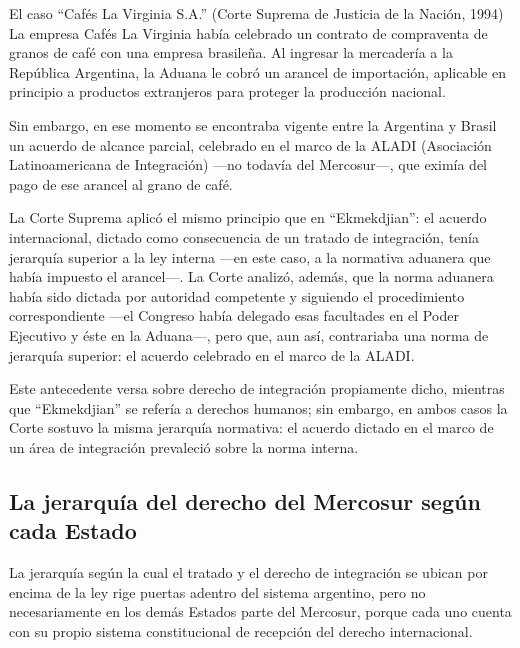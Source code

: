 \documentclass[12pt,oneside]{book}
\begin{document}
\begin{example}{El caso ``Cafés La Virginia S.A.'' (Corte Suprema de Justicia de la Nación, 1994)}
La empresa Cafés La Virginia había celebrado un contrato de compraventa de granos de café con una empresa brasileña. Al ingresar la mercadería a la República Argentina, la Aduana le cobró un arancel de importación, aplicable en principio a productos extranjeros para proteger la producción nacional.

Sin embargo, en ese momento se encontraba vigente entre la Argentina y Brasil un acuerdo de alcance parcial, celebrado en el marco de la ALADI (Asociación Latinoamericana de Integración) —no todavía del Mercosur—, que eximía del pago de ese arancel al grano de café.

La Corte Suprema aplicó el mismo principio que en ``Ekmekdjian'': el acuerdo internacional, dictado como consecuencia de un tratado de integración, tenía jerarquía superior a la ley interna —en este caso, a la normativa aduanera que había impuesto el arancel—. La Corte analizó, además, que la norma aduanera había sido dictada por autoridad competente y siguiendo el procedimiento correspondiente —el Congreso había delegado esas facultades en el Poder Ejecutivo y éste en la Aduana—, pero que, aun así, contrariaba una norma de jerarquía superior: el acuerdo celebrado en el marco de la ALADI.
\end{example}

Este antecedente versa sobre derecho de integración propiamente dicho, mientras que ``Ekmekdjian'' se refería a derechos humanos; sin embargo, en ambos casos la Corte sostuvo la misma jerarquía normativa: el acuerdo dictado en el marco de un área de integración prevaleció sobre la norma interna.

\subsection{La jerarquía del derecho del Mercosur según cada Estado}

La jerarquía según la cual el tratado y el derecho de integración se ubican por encima de la ley rige puertas adentro del sistema argentino, pero no necesariamente en los demás Estados parte del Mercosur, porque cada uno cuenta con su propio sistema constitucional de recepción del derecho internacional.
\end{document}
